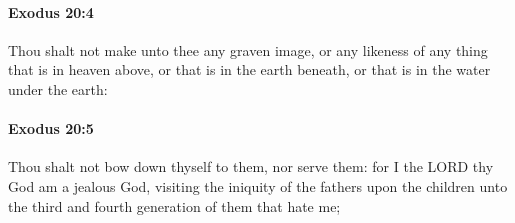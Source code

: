 		\paragraph{Exodus 20:4} %
			\label{EXODUS-20-4}

			Thou shalt not make unto thee any graven image, or any likeness of any thing that is in heaven above, or that is in the earth beneath, or that is in the water under the earth:


		\paragraph{Exodus 20:5} %
			\label{EXODUS-20-5}

			Thou shalt not bow down thyself to them, nor serve them: for I the LORD thy God am a jealous God, visiting the iniquity of the fathers upon the children unto the third and fourth generation of them that hate me;

